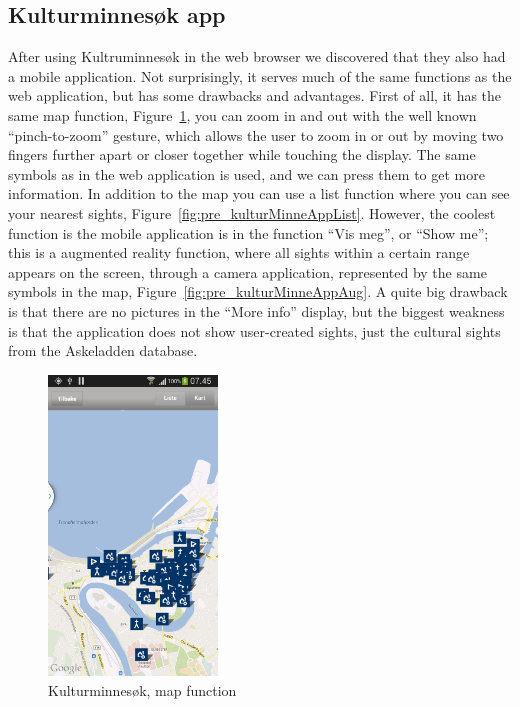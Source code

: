 \documentclass[11pt]{book}
\begin{document}
\subsection{Kulturminnesøk app}
After using Kultruminnesøk in the web browser we discovered that they also had a mobile application. Not surprisingly, it serves much of the same functions as the web application, but has some drawbacks and  advantages. First of all, it has the same map function, Figure~\ref{fig:pre_kulturMinneAppMap}, you can zoom in and out with the well known ``pinch-to-zoom'' gesture, which allows the user to zoom in or out by moving two fingers further apart or closer together while touching the display. The same symbols as in the web application is used, and we can press them to get more information. In addition to the map you can use a list function where you can see your nearest sights, Figure~\ref{fig:pre_kulturMinneAppList}. However, the coolest function is the mobile application is in the function ``Vis meg'', or ``Show me''; this is a augmented reality function, where all sights within a certain range appears on the screen, through a camera application, represented by the same symbols in the map, Figure~\ref{fig:pre_kulturMinneAppAug}.  A quite big drawback is that there are no pictures in the ``More info'' display, but the biggest weakness is that the application does not show user-created sights, just the cultural sights from the Askeladden database.

\begin{figure}[H]
      \centering
      \includegraphics[width=0.4\textwidth]{Figures/Prestudy/kulturSokMap.png}
      \caption{Kulturminnesøk, map function}
      \label{fig:pre_kulturMinneAppMap}
\end{figure}
\end{document}
